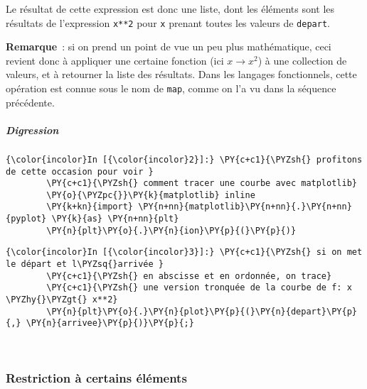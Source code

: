     Le résultat de cette expression est donc une liste, dont les éléments
sont les résultats de l'expression \texttt{x**2} pour \texttt{x} prenant
toutes les valeurs de \texttt{depart}.

    \textbf{Remarque}~: si on prend un point de vue un peu plus
mathématique, ceci revient donc à appliquer une certaine fonction (ici
\(x \rightarrow x^2\)) à une collection de valeurs, et à retourner la
liste des résultats. Dans les langages fonctionnels, cette opération est
connue sous le nom de \texttt{map}, comme on l'a vu dans la séquence
précédente.

    \hypertarget{digression}{%
\subparagraph{Digression}\label{digression}}

    \begin{Verbatim}[commandchars=\\\{\},frame=single,framerule=0.3mm,rulecolor=\color{cellframecolor}]
{\color{incolor}In [{\color{incolor}2}]:} \PY{c+c1}{\PYZsh{} profitons de cette occasion pour voir }
        \PY{c+c1}{\PYZsh{} comment tracer une courbe avec matplotlib}
        \PY{o}{\PYZpc{}}\PY{k}{matplotlib} inline
        \PY{k+kn}{import} \PY{n+nn}{matplotlib}\PY{n+nn}{.}\PY{n+nn}{pyplot} \PY{k}{as} \PY{n+nn}{plt}
        \PY{n}{plt}\PY{o}{.}\PY{n}{ion}\PY{p}{(}\PY{p}{)}
\end{Verbatim}


    \begin{Verbatim}[commandchars=\\\{\},frame=single,framerule=0.3mm,rulecolor=\color{cellframecolor}]
{\color{incolor}In [{\color{incolor}3}]:} \PY{c+c1}{\PYZsh{} si on met le départ et l\PYZsq{}arrivée }
        \PY{c+c1}{\PYZsh{} en abscisse et en ordonnée, on trace}
        \PY{c+c1}{\PYZsh{} une version tronquée de la courbe de f: x \PYZhy{}\PYZgt{} x**2}
        \PY{n}{plt}\PY{o}{.}\PY{n}{plot}\PY{p}{(}\PY{n}{depart}\PY{p}{,} \PY{n}{arrivee}\PY{p}{)}\PY{p}{;}
\end{Verbatim}


    \begin{center}
    \end{center}
    { \hspace*{\fill} \\}
    
    \hypertarget{restriction-uxe0-certains-uxe9luxe9ments}{%
\subsubsection{Restriction à certains
éléments}\label{restriction-uxe0-certains-uxe9luxe9ments}}

